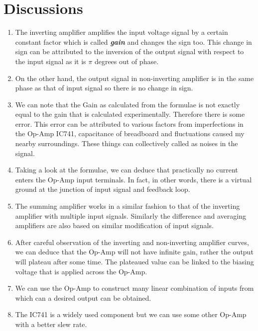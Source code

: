 \section{Discussions}
\begin{enumerate}
    \item The inverting amplifier amplifies the input voltage signal by a certain constant factor which is called \textbf{\emph{gain}} and changes the sign too. This change in sign can be attributed to the inversion of the output signal with respect to the input signal as it is $\pi$ degrees out of phase.
    \item On the other hand, the output signal in non-inverting amplifier is in the same phase as that of input signal so there is no change in sign.
    \item We can note that the Gain as calculated from the formulae is not exactly equal to the gain that is calculated experimentally. Therefore there is some error. This error can be attributed to various factors from imperfections in the Op-Amp IC741, capacitance of breadboard and fluctuations caused my nearby surroundings. These things can collectively called as noises in the signal.
    \item Taking a look at the formulae, we can deduce that practically no current enters the Op-Amp input terminals. In fact, in other words, there is a virtual ground at the junction of input signal and feedback loop.
    \item The summing amplifier works in a similar fashion to that of the inverting amplifier with multiple input signals. Similarly the difference and averaging amplifiers are also based on similar modification of input signals.
    \item After careful observation of the inverting and non-inverting amplifier curves, we can deduce that the Op-Amp will not have infinite gain, rather the output will plateau after some time. The plateaued value can be linked to the biasing voltage that is applied across the Op-Amp.
    \item We can use the Op-Amp to construct many linear combination of inputs from which can a desired output can be obtained.
    \item The IC741 is a widely used component but we can use some other Op-Amp with a better slew rate.
    
\end{enumerate}
